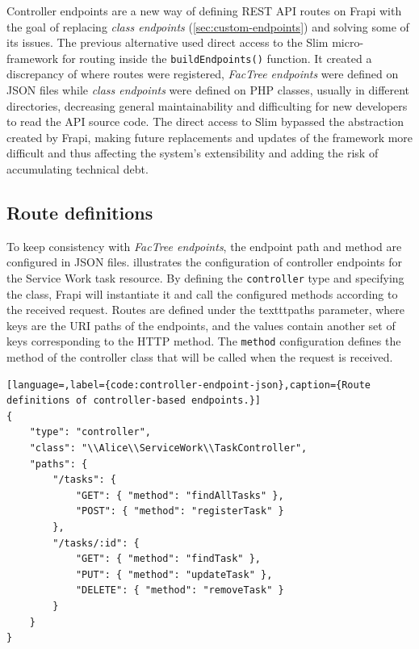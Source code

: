 Controller endpoints are a new way of defining REST API routes on Frapi with the goal of replacing \textit{class endpoints} (\autoref{sec:custom-endpoints}) and solving some of its issues. The previous alternative used direct access to the Slim micro-framework for routing inside the \texttt{buildEndpoints()} function. It created a discrepancy of where routes were registered, \textit{FacTree endpoints} were defined on JSON files while \textit{class endpoints} were defined on PHP classes, usually in different directories, decreasing general maintainability and difficulting for new developers to read the API source code. The direct access to Slim bypassed the abstraction created by Frapi, making future replacements and updates of the framework more difficult and thus affecting the system's extensibility and adding the risk of accumulating technical debt.

\subsection{Route definitions}

To keep consistency with \textit{FacTree endpoints}, the endpoint path and method are configured in JSON files.  illustrates the configuration of controller endpoints for the Service Work task resource. By defining the \texttt{controller} type and specifying the class, Frapi will instantiate it and call the configured methods according to the received request. Routes are defined under the texttt{paths} parameter, where keys are the URI paths of the endpoints, and the values contain another set of keys corresponding to the HTTP method. The \texttt{method} configuration defines the method of the controller class that will be called when the request is received.

\begin{lstlisting}[language=,label={code:controller-endpoint-json},caption={Route definitions of controller-based endpoints.}]
{
    "type": "controller",
    "class": "\\Alice\\ServiceWork\\TaskController",
    "paths": {
        "/tasks": {
            "GET": { "method": "findAllTasks" },
            "POST": { "method": "registerTask" }
        },
        "/tasks/:id": {
	        "GET": { "method": "findTask" },
            "PUT": { "method": "updateTask" },
            "DELETE": { "method": "removeTask" }
        }
    }
}
\end{lstlisting}

